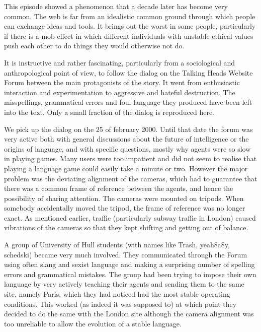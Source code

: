 This episode showed a phenomenon that a decade later has become very common. The web is far from an idealistic common 
ground through which people can exchange ideas and tools. It brings out the worst in some people, particularly 
if there is a mob effect in which different individuals with unstable ethical values 
push each other to do things they would otherwise not do. 

It is instructive and rather fascinating, particularly from a sociological and anthropological point of 
view, to follow the dialog on the Talking Heads Website Forum between the main protagonists of the story.
It went from enthusiastic interaction and experimentation to aggressive and hateful 
destruction. The misspellings, grammatical errors and foul language they produced have been left into the text. 
Only a small fraction of the dialog is reproduced here.  

We pick up the dialog on the 25 of february 2000. Until that date the forum was very active both 
with general discussions about the future of intelligence or the origins of language, and with specific questions, mostly 
why agents were so slow in playing games. Many users were too impatient and did not seem to realise that playing 
a language game could easily take a minute or two. However the major problem was the deviating alignment of the cameras, 
which had to guarantee that there was a common frame of reference between the agents, and hence the 
possibility of sharing attention. The cameras were mounted on tripods. When somebody accidentally 
moved the tripod, the frame of reference was no longer exact. As mentioned earlier, traffic (particularly subway 
traffic in London) caused vibrations of the cameras so that they kept shifting and getting out of balance. 

A group of University of Hull students (with names like Trash, yeah8a8y, schedski) 
became very much involved. They 
communicated through the Forum using often slang and sexist language and making a surprising 
number of spelling errors and grammatical mistakes. The group had been 
trying to impose their own language by very actively teaching their agents and sending them to the same site, namely 
Paris, which they had noticed had the most stable operating conditions. This worked (as indeed it was supposed to) 
at which point they decided to do the same with the London site although the camera 
alignment was too unreliable to allow the evolution of a stable language. 

